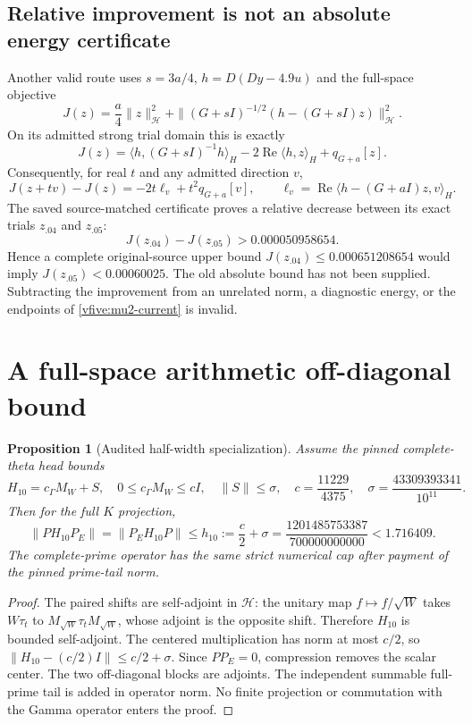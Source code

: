 \documentclass[11pt,a4paper]{article}
\numberwithin{equation}{section}
\newtheorem{proposition}[theorem]{Proposition}
\theoremstyle{definition}\newtheorem{definition}[theorem]{Definition}
\theoremstyle{remark}\newtheorem{remark}[theorem]{Remark}
\newcommand{\rhip}[2]{\langle#1,#2\rangle_H}
\newcommand{\Hh}{\mathcal H}\newcommand{\Hw}{\mathcal H}
\begin{document}
\subsection{Relative improvement is not an absolute energy certificate}
Another valid route uses $s=3a/4$, $h=D(Dy-4.9u)$ and the full-space objective
\[
 J(z)=\frac a4\|z\|_{\Hh}^2+
 \|(G+sI)^{-1/2}(h-(G+sI)z)\|_{\Hh}^2.
\]
On its admitted strong trial domain this is exactly
\[
 J(z)=\rhip{h}{(G+sI)^{-1}h}-2\operatorname{Re}\rhip{h}{z}
       +q_{G+a}[z].
\]
Consequently, for real $t$ and any admitted direction $v$,
\begin{equation}\label{vfive:descent}
 J(z+tv)-J(z)=-2t\ell_v+t^2q_{G+a}[v],
 \qquad \ell_v=\operatorname{Re}\rhip{h-(G+aI)z}{v}.
\end{equation}
The saved source-matched certificate proves a relative decrease between its exact trials $z_{.04}$ and $z_{.05}$:
\[
 J(z_{.04})-J(z_{.05})>0.000050958654.
\]
Hence a complete original-source upper bound $J(z_{.04})\leq0.000651208654$ would imply $J(z_{.05})<0.00060025$. The old absolute bound has not been supplied. Subtracting the improvement from an unrelated norm, a diagnostic energy, or the endpoints of \eqref{vfive:mu2-current} is invalid.

\section{A full-space arithmetic off-diagonal bound}\label{vfive:halfwidth}
\begin{proposition}[Audited half-width specialization]\label{vfive:halfwidth-prop}
Assume the pinned complete-theta head bounds
\[
 H_{10}=c_\Gamma M_W+S,\quad 0\leq c_\Gamma M_W\leq cI,
 \quad\|S\|\leq\sigma,
 \quad c=\frac{11229}{4375},\quad
 \sigma=\frac{43309393341}{10^{11}}.
\]
Then for the full $K$ projection,
\[
 \|PH_{10}P_E\|=\|P_EH_{10}P\|
 \leq h_{10}:=\frac c2+\sigma
 =\frac{1201485753387}{700000000000}<1.716409.
\]
The complete-prime operator has the same strict numerical cap after payment of the pinned prime-tail norm.
\end{proposition}
\begin{proof}
The paired shifts are self-adjoint in $\Hh$: the unitary map $f\mapsto f/\sqrt W$ takes $W\tau_t$ to $M_{\sqrt W}\tau_tM_{\sqrt W}$, whose adjoint is the opposite shift. Therefore $H_{10}$ is bounded self-adjoint. The centered multiplication has norm at most $c/2$, so $\|H_{10}-(c/2)I\|\leq c/2+\sigma$. Since $PP_E=0$, compression removes the scalar center. The two off-diagonal blocks are adjoints. The independent summable full-prime tail is added in operator norm. No finite projection or commutation with the Gamma operator enters the proof.
\end{proof}
\end{document}
